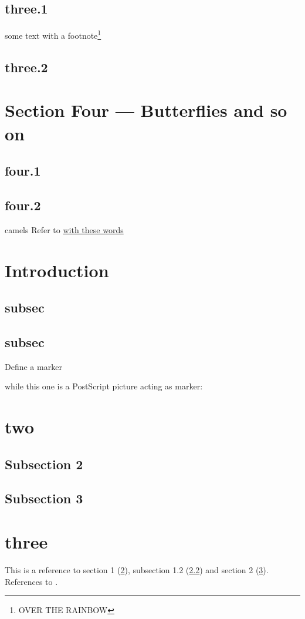 \documentclass[]{book}
\begin{document}
\subsection{three.1}
some text with a footnote\footnote{OVER THE RAINBOW}
\subsection{three.2}

\newpage
\section[Section Four --- Butterflies]{Section Four --- Butterflies and so on}
\subsection{four.1}
\subsection{four.2}
camels
Refer to \hyperref{}{test}{test1}{with these words}
\newpage
\section{Introduction}\label{sec1}
\subsection{subsec}
\newpage
\subsection{subsec}\label{subsec1.2}
Define a marker  while this one is a
PostScript picture acting as marker:
\hyperlink{testpiccy}{}
\newpage
\section{two}\label{sec2}
\subsection{Subsection 2}
\subsection{Subsection 3}
\newpage
\section{three}
This is a reference to section 1 (\ref{sec1}), subsection 1.2 (\ref{subsec1.2})
and section 2 (\ref{sec2}). References to \cite{Barcelo:1992:caa,Dallas:aia}.
\end{document}
